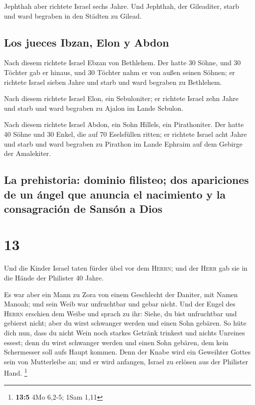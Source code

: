  Jephthah aber richtete Israel sechs Jahre. Und Jephthah,
der Gileaditer, starb und ward begraben in den Städten zu Gilead.

\hypertarget{los-jueces-ibzan-elon-y-abdon}{%
\subsection{Los jueces Ibzan, Elon y
Abdon}\label{los-jueces-ibzan-elon-y-abdon}}

 Nach diesem richtete Israel Ebzan von Bethlehem.
 Der hatte 30 Söhne, und 30 Töchter gab er hinaus, und 30
Töchter nahm er von außen seinen Söhnen; er richtete Israel sieben Jahre
 und starb und ward begraben zu Bethlehem.

 Nach diesem richtete Israel Elon, ein Sebuloniter; er
richtete Israel zehn Jahre  und starb und ward begraben
zu Ajalon im Lande Sebulon.

 Nach diesem richtete Israel Abdon, ein Sohn Hillels, ein
Pirathoniter.  Der hatte 40 Söhne und 30 Enkel, die auf
70 Eselsfüllen ritten; er richtete Israel acht Jahre  und
starb und ward begraben zu Pirathon im Lande Ephraim auf dem Gebirge der
Amalekiter.

\hypertarget{la-prehistoria-dominio-filisteo-dos-apariciones-de-un-uxe1ngel-que-anuncia-el-nacimiento-y-la-consagraciuxf3n-de-sansuxf3n-a-dios}{%
\subsection{La prehistoria: dominio filisteo; dos apariciones de un
ángel que anuncia el nacimiento y la consagración de Sansón a
Dios}\label{la-prehistoria-dominio-filisteo-dos-apariciones-de-un-uxe1ngel-que-anuncia-el-nacimiento-y-la-consagraciuxf3n-de-sansuxf3n-a-dios}}

\hypertarget{section-12}{%
\section{13}\label{section-12}}

 Und die Kinder Israel taten fürder übel vor dem
\textsc{Herrn}; und der \textsc{Herr} gab sie in die Hände der Philister
40 Jahre.

 Es war aber ein Mann zu Zora von einem Geschlecht der
Daniter, mit Namen Manoah; und sein Weib war unfruchtbar und gebar
nicht.  Und der Engel des \textsc{Herrn} erschien dem
Weibe und sprach zu ihr: Siehe, du bist unfruchtbar und gebierst nicht;
aber du wirst schwanger werden und einen Sohn gebären.  So
hüte dich nun, dass du nicht Wein noch starkes Getränk trinkest und
nichts Unreines essest;  denn du wirst schwanger werden
und einen Sohn gebären, dem kein Schermesser soll aufs Haupt kommen.
Denn der Knabe wird ein Geweihter Gottes sein von Mutterleibe an; und er
wird anfangen, Israel zu erlösen aus der Philister Hand. \footnote{\textbf{13:5}
  4Mo 6,2-5; 1Sam 1,11}

